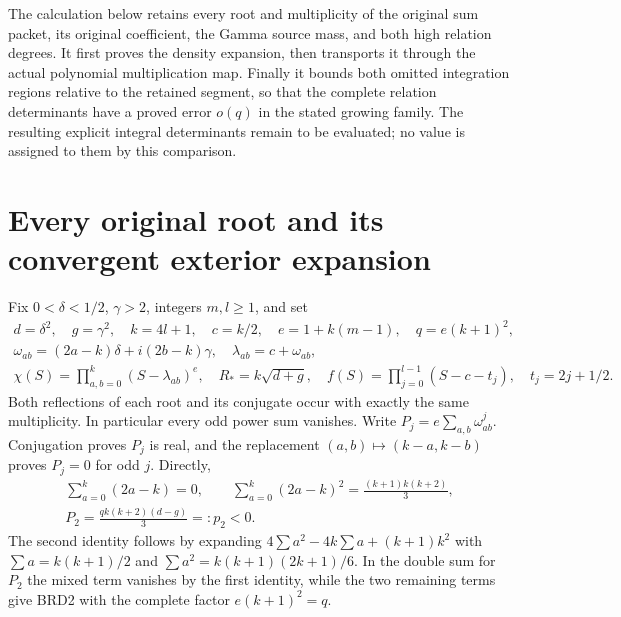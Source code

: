 The calculation below retains every root and multiplicity of the
original sum packet, its original coefficient, the Gamma source mass,
and both high relation degrees. It first proves the density expansion,
then transports it through the actual polynomial multiplication map.
Finally it bounds both omitted integration regions relative to the
retained segment, so that the complete relation determinants have a
proved error $o(q)$ in the stated growing family. The resulting
explicit integral determinants remain to be evaluated; no value is
assigned to them by this comparison.

\section{Every original root and its convergent exterior expansion}

Fix $0<\delta<1/2$, $\gamma>2$, integers $m,l\geq1$, and set
\[
\begin{gathered}
 d=\delta^2,\quad g=\gamma^2,\quad k=4l+1,\quad
 c=k/2,\quad e=1+k(m-1),\quad q=e(k+1)^2,\\
 \omega_{ab}=(2a-k)\delta+i(2b-k)\gamma,
 \quad \lambda_{ab}=c+\omega_{ab},\\
 \chi(S)=\prod_{a,b=0}^k(S-\lambda_{ab})^e,
 \quad R_*=k\sqrt{d+g},\quad
 f(S)=\prod_{j=0}^{l-1}(S-c-t_j),\quad t_j=2j+1/2.
\end{gathered}\tag{BRD1}
\]
Both reflections of each root and its conjugate occur with exactly
the same multiplicity. In particular every odd power sum vanishes.
Write $P_j=e\sum_{a,b}\omega_{ab}^j$. Conjugation proves $P_j$
is real, and the replacement $(a,b)\mapsto(k-a,k-b)$ proves
$P_j=0$ for odd $j$. Directly,
\[
\begin{gathered}
 \sum_{a=0}^k(2a-k)=0,\qquad
 \sum_{a=0}^k(2a-k)^2=\frac{(k+1)k(k+2)}3,\\
 P_2=\frac{qk(k+2)(d-g)}3=:p_2<0.
\end{gathered}\tag{BRD2}
\]
The second identity follows by expanding $4\sum a^2-4k\sum a+
(k+1)k^2$ with $\sum a=k(k+1)/2$ and
$\sum a^2=k(k+1)(2k+1)/6$. In the double sum for $P_2$ the
mixed term vanishes by the first identity, while the two remaining
terms give BRD2 with the complete factor $e(k+1)^2=q$.

